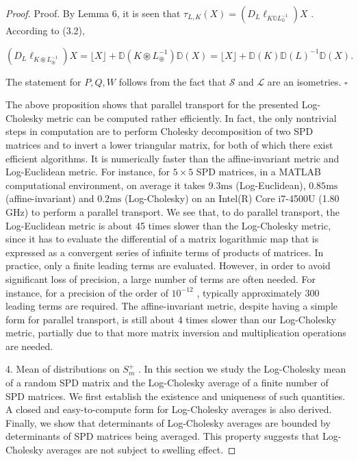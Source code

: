\documentclass[11pt]{article}
\begin{document}
\begin{proof}
Proof. By Lemma 6, it is seen that  $\tau_{L,K}(X) = (D_L\ell_{K\mathbb{O}L_{\mathbb{O}}^{-1}})X$ . According to (3.2),

$$
(D _ {L} \ell_ {K \circledast L _ {\circledast} ^ {- 1}}) X = \lfloor X \rfloor + \mathbb {D} (K \circledast L _ {\circledast} ^ {- 1}) \mathbb {D} (X) = \lfloor X \rfloor + \mathbb {D} (K) \mathbb {D} (L) ^ {- 1} \mathbb {D} (X).
$$

The statement for  $P, Q, W$  follows from the fact that  $\mathcal{S}$  and  $\mathcal{L}$  are an isometries.  $\square$

The above proposition shows that parallel transport for the presented Log-Cholesky metric can be computed rather efficiently. In fact, the only nontrivial steps in computation are to perform Cholesky decomposition of two SPD matrices and to invert a lower triangular matrix, for both of which there exist efficient algorithms. It is numerically faster than the affine-invariant metric and Log-Euclidean metric. For instance, for  $5 \times 5$  SPD matrices, in a MATLAB computational environment, on average it takes  $9.3\mathrm{ms}$  (Log-Euclidean),  $0.85\mathrm{ms}$  (affine-invariant) and  $0.2\mathrm{ms}$  (Log-Cholesky) on an Intel(R) Core i7-4500U (1.80 GHz) to perform a parallel transport. We see that, to do parallel transport, the Log-Euclidean metric is about 45 times slower than the Log-Cholesky metric, since it has to evaluate the differential of a matrix logarithmic map that is expressed as a convergent series of infinite terms of products of matrices. In practice, only a finite leading terms are evaluated. However, in order to avoid significant loss of precision, a large number of terms are often needed. For instance, for a precision of the order of  $10^{-12}$ , typically approximately 300 leading terms are required. The affine-invariant metric, despite having a simple form for parallel transport, is still about 4 times slower than our Log-Cholesky metric, partially due to that more matrix inversion and multiplication operations are needed.

4. Mean of distributions on  $S_{m}^{+}$ . In this section we study the Log-Cholesky mean of a random SPD matrix and the Log-Cholesky average of a finite number of SPD matrices. We first establish the existence and uniqueness of such quantities. A closed and easy-to-compute form for Log-Cholesky averages is also derived. Finally, we show that determinants of Log-Cholesky averages are bounded by determinants of SPD matrices being averaged. This property suggests that Log-Cholesky averages are not subject to swelling effect.


\end{proof}
\end{document}
